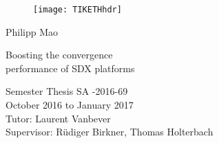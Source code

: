   \begin{titlepage}

  \begin{center}
  \begin{figure}[!t]
     \texttt{[image: TIKETHhdr]}
  \end{figure}
  \end{center}

  \vspace{2 cm}

  {\large Philipp Mao}
  \vspace{2 cm}

  {\Huge Boosting the convergence \\ performance of SDX platforms}\\

  \vspace{\fill}


  Semester Thesis SA -2016-69\\
  October 2016 to January 2017\\

  \vspace{1cm}
  Tutor: Laurent Vanbever \\
  Supervisor: Rüdiger Birkner, Thomas Holterbach \\
    
  \end{titlepage}
